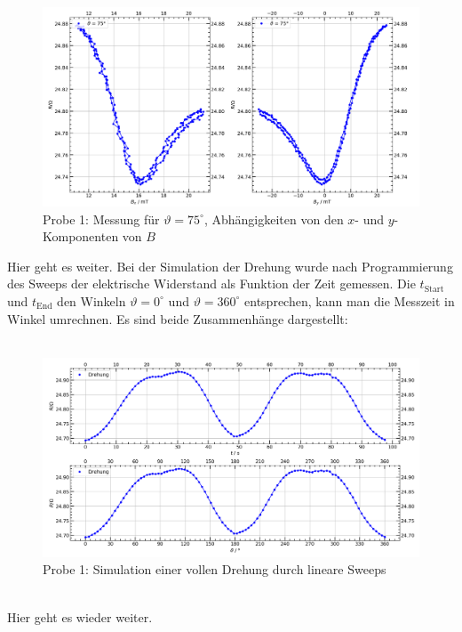 \documentclass[german,  %
parskip=full,  %
]{scrartcl}
\begin{document}
\begin{figure}[h!]\centering
\includegraphics[width=\textwidth]{Probe1_75_Grad.png}
\caption{Probe 1: Messung für \(\vartheta=75^{\circ}\), Abhängigkeiten von den \(x\)- und \(y\)-Komponenten von \(B\)}
\end{figure}
\newpage  
Hier geht es weiter.
Bei der Simulation der Drehung wurde nach Programmierung des Sweeps der elektrische Widerstand als Funktion der Zeit gemessen. Die \(t_{\mathrm{Start}}\) und \(t_{\mathrm{End}}\) den Winkeln \(\vartheta = 0^{\circ}\) und \(\vartheta = 360^{\circ}\) entsprechen, kann man die Messzeit in Winkel umrechnen. Es sind beide Zusammenhänge dargestellt: \\\\
\begin{figure}[h!]\centering
\includegraphics[width=\textwidth]{Probe1_Drehung.png}
\caption{Probe 1: Simulation einer vollen Drehung durch lineare Sweeps}
\end{figure}\\
Hier geht es wieder weiter.
\end{document}
